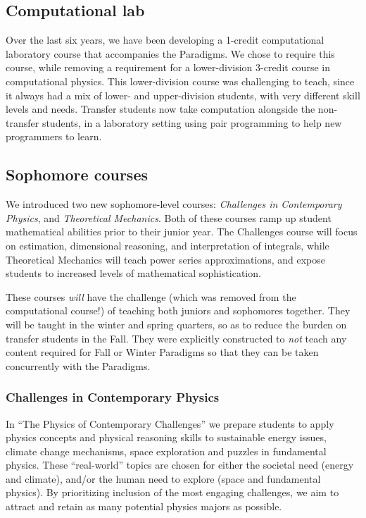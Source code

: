 \documentclass[english,aps,pra,reprint,noshowpacs,superscriptaddress]{revtex4-1}
\begin{document}
\subsection{Computational lab}
Over the last six years, we have been developing a 1-credit
computational laboratory course that accompanies the Paradigms.  We
chose to require this course, while removing a requirement for a
lower-division 3-credit course in computational physics.  This
lower-division course was challenging to teach, since it always had a
mix of lower- and upper-division students, with very different skill
levels and needs.  Transfer students now take computation alongside
the non-transfer students, in a laboratory setting using pair
programming to help new programmers to learn.

\subsection{Sophomore courses}
We introduced two new sophomore-level courses: \emph{Challenges in
  Contemporary Physics}, and \emph{Theoretical Mechanics}.  Both of
these courses ramp up student mathematical abilities prior to their
junior year.  The Challenges course will focus on estimation,
dimensional reasoning, and interpretation of integrals, while
Theoretical Mechanics will teach power series approximations, and
expose students to increased levels of mathematical sophistication.

These courses \emph{will} have the challenge (which was removed from
the computational course!) of teaching both juniors and sophomores
together.  They will be taught in the winter and spring quarters, so
as to reduce the burden on transfer students in the Fall.  They were
explicitly constructed to \emph{not} teach any content required for
Fall or Winter Paradigms so that they can be taken concurrently with
the Paradigms.

\subsubsection{Challenges in Contemporary Physics}

In ``The Physics of Contemporary Challenges'' we prepare students to
apply physics concepts and physical reasoning skills to sustainable
energy issues, climate change mechanisms, space exploration and
puzzles in fundamental physics. These ``real-world'' topics are chosen
for either the societal need (energy and climate), and/or the human
need to explore (space and fundamental physics). By prioritizing
inclusion of the most engaging challenges, we aim to attract and
retain as many potential physics majors as possible.
\end{document}
